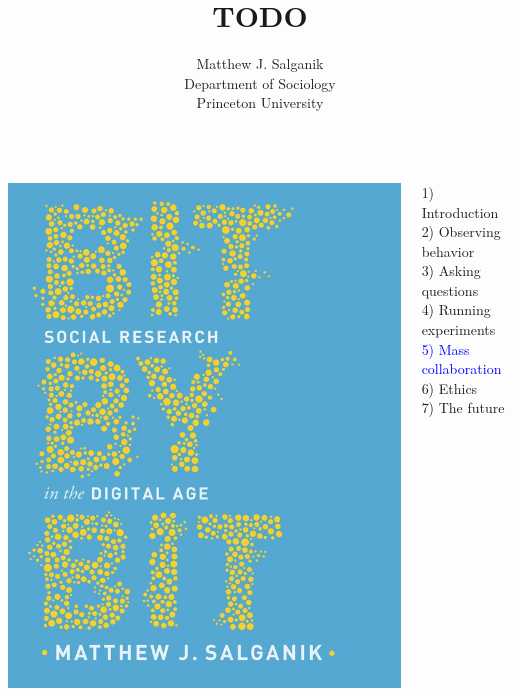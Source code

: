 \documentclass[aspectratio=169]{beamer}
\title[]{ TODO }
\author[]{Matthew J. Salganik\\Department of Sociology\\Princeton University}
\date[]{%
\begin{flushright}
\texttt{[image: figures/cc-by.png]}
\end{flushright}
}
\begin{document}
\frame{\titlepage}
\begin{frame}

\begin{columns}
\begin{column}{.40\textwidth}
\includegraphics[width=\textwidth]{figures/salganik_bit_2018_cover}
\end{column}%

\hfill%

\begin{column}{.60\textwidth}
1) Introduction \\
2) Observing behavior \\
3) Asking questions \\
4) Running experiments \\
\textcolor{blue}{5) Mass collaboration} \\
6) Ethics \\
7) The future \\
\end{column}%
\end{columns}

\end{frame}
\end{document}
